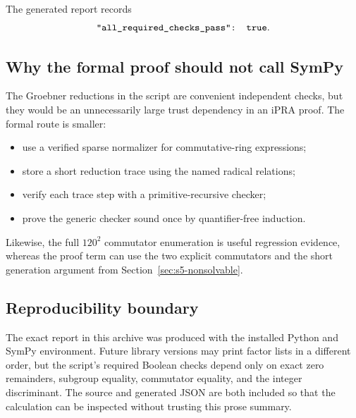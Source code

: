 The generated report records
\[
 \code{"all_required_checks_pass": true}.
\]

\subsection{Why the formal proof should not call SymPy}

The Groebner reductions in the script are convenient independent checks, but
they would be an unnecessarily large trust dependency in an iPRA proof.  The
formal route is smaller:

\begin{itemize}
\item use a verified sparse normalizer for commutative-ring expressions;
\item store a short reduction trace using the named radical relations;
\item verify each trace step with a primitive-recursive checker;
\item prove the generic checker sound once by quantifier-free induction.
\end{itemize}

Likewise, the full $120^2$ commutator enumeration is useful regression
evidence, whereas the proof term can use the two explicit commutators and the
short generation argument from Section~\ref{sec:s5-nonsolvable}.

\subsection{Reproducibility boundary}

The exact report in this archive was produced with the installed Python and
SymPy environment.  Future library versions may print factor lists in a
different order, but the script's required Boolean checks depend only on exact
zero remainders, subgroup equality, commutator equality, and the integer
discriminant.  The source and generated JSON are both included so that the
calculation can be inspected without trusting this prose summary.
